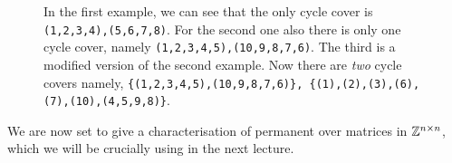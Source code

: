 \begin{figure}[htp!]
\caption{{\small In the first example, we can see that the only cycle cover is 
\texttt{(1,2,3,4),(5,6,7,8)}. For the second one also there is only one
cycle cover, namely \texttt{(1,2,3,4,5),(10,9,8,7,6)}.
The third is a modified version of the second example. Now there are
\emph{two} cycle covers namely, \texttt{\{(1,2,3,4,5),(10,9,8,7,6)\},
\{(1),(2),(3),(6),(7),(10),(4,5,9,8)\}}}.
}
\end{figure}

We are now set to give a characterisation of permanent over matrices in 
${\mathbb{Z}}^{n \times n}$, which we will be crucially using in the next lecture.

